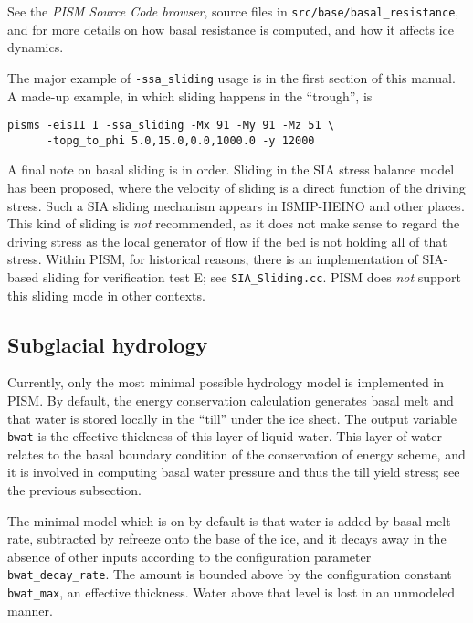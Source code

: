 See the \emph{PISM Source Code browser}, source files in \texttt{src/base/basal_resistance}, and \cite{BBssasliding,BKAJS,Martinetal2011,Winkelmannetal2011} for more details on how basal resistance is computed, and how it affects ice dynamics.

The major example of \texttt{-ssa_sliding} usage is in the first section of this manual.  A made-up example, in which sliding happens in the ``trough'', is
\begin{verbatim}
pisms -eisII I -ssa_sliding -Mx 91 -My 91 -Mz 51 \
      -topg_to_phi 5.0,15.0,0.0,1000.0 -y 12000
\end{verbatim}

A final note on basal sliding is in order.  Sliding in the SIA stress balance model has been proposed, where the velocity of sliding is a direct function of the driving stress.  Such a SIA sliding mechanism appears in ISMIP-HEINO \cite{Calovetal2009HEINOfinal} and other places.  This kind of sliding is \emph{not} recommended, as it does not make sense to regard the driving stress as the local generator of flow if the bed is not holding all of that stress.  Within PISM, for historical reasons, there is an implementation of SIA-based sliding for verification test E; see \texttt{SIA_Sliding.cc}.  PISM does \emph{not} support this sliding mode in other contexts.


\subsection{Subglacial hydrology}  \label{subsect:subhydro}

Currently, only the most minimal possible hydrology model is implemented in PISM.  By default, the energy conservation calculation generates basal melt and that water is stored locally in the ``till'' under the ice sheet.  The output variable \texttt{bwat} is the effective thickness of this layer of liquid water.  This layer of water relates to the basal boundary condition of the conservation of energy scheme, and it is involved in computing basal water pressure and thus the till yield stress; see the previous subsection.

The minimal model which is on by default is that water is added by basal melt rate, subtracted by refreeze onto the base of the ice, and it decays away in the absence of other inputs according to the configuration parameter \texttt{bwat_decay_rate}.  The amount is bounded above by the configuration constant \texttt{bwat_max}, an effective thickness.  Water above that level is lost in an unmodeled manner.

